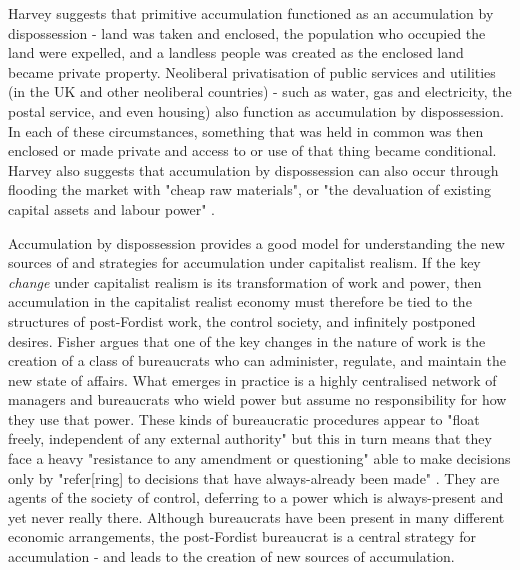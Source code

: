Harvey suggests that primitive accumulation functioned as an accumulation by dispossession - land was taken and enclosed, the population who occupied the land were expelled, and a landless people was created as the enclosed land became private property. Neoliberal privatisation of public services and utilities (in the UK and other neoliberal countries) - such as water, gas and electricity, the postal service, and even housing) also function as accumulation by dispossession. In each of these circumstances, something that was held in common was then enclosed or made private and access to or use of that thing became conditional. Harvey also suggests that accumulation by dispossession can also occur through flooding the market with "cheap raw materials", or "the devaluation of existing capital assets and labour power" \citep[p. 150]{harvey_new_2003}.

Accumulation by dispossession provides a good model for understanding the new sources of and strategies for accumulation under capitalist realism. If the key \emph{change} under capitalist realism is its transformation of work and power, then accumulation in the capitalist realist economy must therefore be tied to the structures of post-Fordist work, the control society, and infinitely postponed desires. Fisher argues that one of the key changes in the nature of work is the creation of a class of bureaucrats who can administer, regulate, and maintain the new state of affairs. What emerges in practice is a highly centralised network of managers and bureaucrats who wield power but assume no responsibility for how they use that power. These kinds of bureaucratic procedures appear to "float freely, independent of any external authority" but this in turn means that they face a heavy "resistance to any amendment or questioning" \citep[p. 55]{fisher_capitalist_2009} able to make decisions only by "refer[ring] to decisions that have always-already been made" \citep[p. 53]{fisher_capitalist_2009}. They are agents of the society of control, deferring to a power which is always-present and yet never really there. Although bureaucrats have been present in many different economic arrangements, the post-Fordist bureaucrat is a central strategy for accumulation - and leads to the creation of new sources of accumulation.

